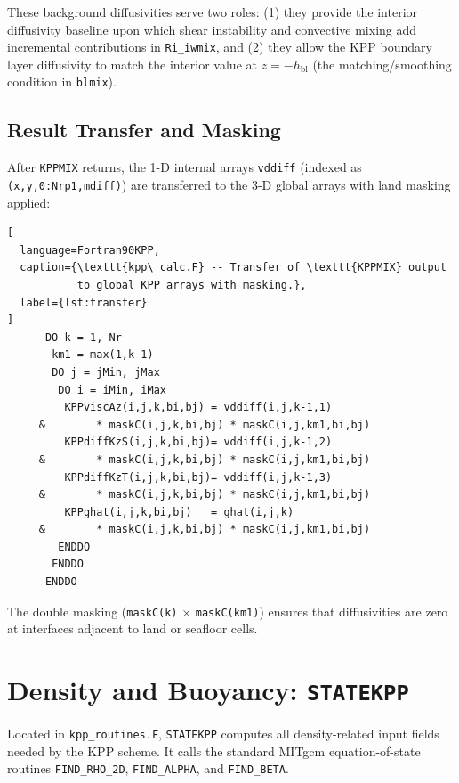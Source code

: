 \documentclass[12pt,letterpaper]{article}
\newcommand{\hbl}{h_{\mathrm{bl}}}
\begin{document}
These background diffusivities serve two roles: (1) they provide the  
interior diffusivity baseline upon which shear instability and convective  
mixing add incremental contributions in \texttt{Ri\_iwmix}, and (2) they  
allow the KPP boundary layer diffusivity to match the interior value  
at $z = -\hbl$ (the matching/smoothing condition in \texttt{blmix}).  
  
\subsection{Result Transfer and Masking}  
  
After \texttt{KPPMIX} returns, the 1-D internal arrays \texttt{vddiff}  
(indexed as \texttt{(x,y,0:Nrp1,mdiff)}) are transferred to the 3-D  
global arrays with land masking applied:  
  
\begin{lstlisting}[  
  language=Fortran90KPP,  
  caption={\texttt{kpp\_calc.F} -- Transfer of \texttt{KPPMIX} output  
           to global KPP arrays with masking.},  
  label={lst:transfer}  
]  
      DO k = 1, Nr  
       km1 = max(1,k-1)  
       DO j = jMin, jMax  
        DO i = iMin, iMax  
         KPPviscAz(i,j,k,bi,bj) = vddiff(i,j,k-1,1)  
     &        * maskC(i,j,k,bi,bj) * maskC(i,j,km1,bi,bj)  
         KPPdiffKzS(i,j,k,bi,bj)= vddiff(i,j,k-1,2)  
     &        * maskC(i,j,k,bi,bj) * maskC(i,j,km1,bi,bj)  
         KPPdiffKzT(i,j,k,bi,bj)= vddiff(i,j,k-1,3)  
     &        * maskC(i,j,k,bi,bj) * maskC(i,j,km1,bi,bj)  
         KPPghat(i,j,k,bi,bj)   = ghat(i,j,k)  
     &        * maskC(i,j,k,bi,bj) * maskC(i,j,km1,bi,bj)  
        ENDDO  
       ENDDO  
      ENDDO  
\end{lstlisting}  
  
The double masking (\texttt{maskC(k)} $\times$ \texttt{maskC(km1)})  
ensures that diffusivities are zero at interfaces adjacent to land  
or seafloor cells.  
  
\section{Density and Buoyancy: \texttt{STATEKPP}}  
  
Located in \texttt{kpp\_routines.F}, \texttt{STATEKPP} computes all  
density-related input fields needed by the KPP scheme. It calls the  
standard MITgcm equation-of-state routines \texttt{FIND\_RHO\_2D},  
\texttt{FIND\_ALPHA}, and \texttt{FIND\_BETA}.  
  
\end{document}
